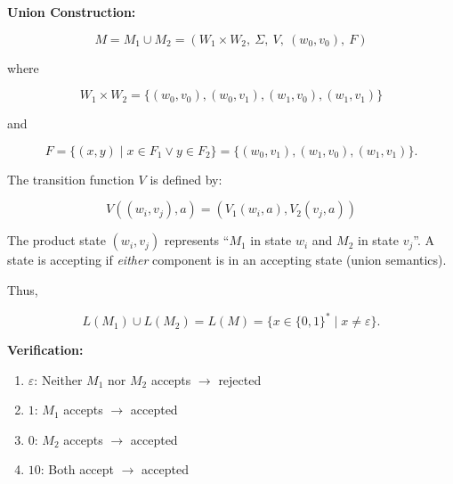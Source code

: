 \documentclass[12pt,a4paper,openany]{article}
\begin{document}
\textbf{Union Construction:}

\[
M = M_1 \cup M_2 = (W_1 \times W_2,\ \Sigma,\ V,\ (w_0,v_0),\ F)
\]

where

\[
W_1 \times W_2 = \{(w_0,v_0), (w_0,v_1), (w_1,v_0), (w_1,v_1)\}
\]

and

\[
F = \{(x,y) \mid x \in F_1 \lor y \in F_2\} = \{(w_0,v_1), (w_1,v_0), (w_1,v_1)\}.
\]

The transition function $V$ is defined by:

\[
V((w_i,v_j), a) = (V_1(w_i, a), V_2(v_j, a))
\]

\begin{center}
\end{center}

The product state $(w_i, v_j)$ represents ``$M_1$ in state $w_i$ and $M_2$ in state $v_j$''. A state is accepting if \emph{either} component is in an accepting state (union semantics).

Thus,

\[
L(M_1) \cup L(M_2) = L(M) = \{x \in \{0,1\}^* \mid x \neq \varepsilon\}.
\]

\textbf{Verification:}

\begin{enumerate}
    \item $\varepsilon$: Neither $M_1$ nor $M_2$ accepts $\to$ rejected 
    \item $1$: $M_1$ accepts $\to$ accepted 
    \item $0$: $M_2$ accepts $\to$ accepted 
    \item $10$: Both accept $\to$ accepted 
\end{enumerate}
\end{document}
